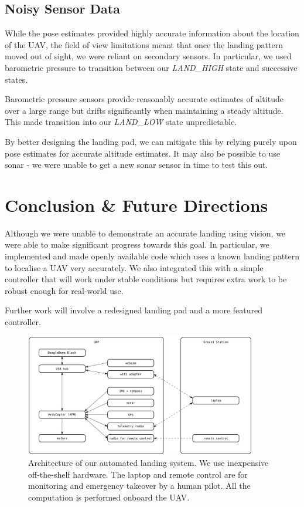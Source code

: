 \documentclass[10pt]{scrartcl} %
\begin{document}
\subsection{Noisy Sensor Data}
While the pose estimates provided highly accurate information about the location of the UAV, the field of view limitations meant that once the landing pattern moved out of sight, we were reliant on secondary sensors. In particular, we used barometric pressure to transition between our \textit{LAND\_HIGH} state and successive states. 

Barometric pressure sensors provide reasonably accurate estimates of altitude over a large range but drifts significantly when maintaining a steady altitude. This made transition into our \textit{LAND\_LOW} state unpredictable.

By better designing the landing pad, we can mitigate this by relying purely upon pose estimates for accurate altitude estimates. It may also be possible to use sonar - we were unable to get a new sonar sensor in time to test this out.


\section{Conclusion \& Future Directions}
Although we were unable to demonstrate an accurate landing using vision, we were able to make significant progress towards this goal. In particular, we implemented and made openly available code which uses a known landing pattern to localise a UAV very accurately. We also integrated this with a simple controller that will work under stable conditions but requires extra work to be robust enough for real-world use.

Further work will involve a redesigned landing pad and a more featured controller.


\printbibliography


\clearpage

\begin{figure}[h!]
\centering
\includegraphics[width=0.9\textwidth]{images/architecture.png}
\caption{
    Architecture of our automated landing system. We use inexpensive
    off-the-shelf hardware. The laptop and remote control are for
    monitoring and emergency takeover by a human pilot. All the
    computation is performed onboard the UAV.
}
\label{fig:hardware-arch}
\end{figure}
\end{document}
